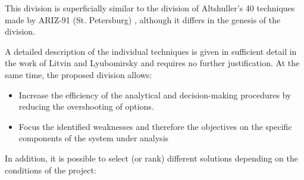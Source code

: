 \documentclass[a4paper,11pt]{article}
\begin{document}
This division is superficially similar to the division of Altshuller's 40
techniques made by ARIZ-91 (St. Petersburg) \cite{B14}, although it differs in
the genesis of the division.

A detailed description of the individual techniques is given in sufficient
detail in the work of Litvin and Lyubomirsky and requires no further
justification. At the same time, the proposed division allows:
\begin{itemize}
\item Increase the efficiency of the analytical and decision-making procedures
  by reducing the overshooting of options.
\item Focus the identified weaknesses and therefore the objectives on the
  specific components of the system under analysis
\end{itemize}
In addition, it is possible to select (or rank) different solutions depending
on the conditions of the project:
\end{document}
